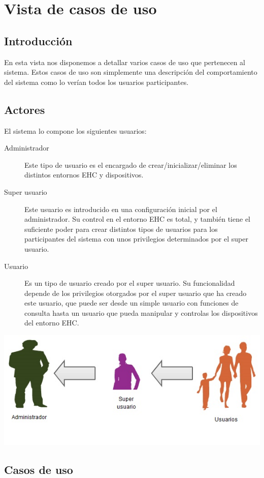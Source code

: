 \chapter{Vista de casos de uso}
\section{Introducci\'on}
En esta vista nos disponemos a detallar varios casos de uso que pertenecen al sistema. Estos casos de uso son simplemente una descripci\'on del comportamiento del sistema como lo ver\'ian todos los usuarios participantes.

\section{Actores}
El sistema lo compone los siguientes usuarios:
\begin{description}
\item[Administrador] Este tipo de usuario es el encargado de crear/inicializar/eliminar los distintos entornos EHC y dispositivos.
\item[Super usuario] Este usuario es introducido en una configuraci\'on inicial por el administrador. Su control en el entorno EHC es total, y tambi\'en tiene el suficiente poder para crear distintos tipos de usuarios para los participantes del sistema con unos privilegios determinados por el super usuario. 
\item[Usuario] Es un tipo de usuario creado por el super usuario. Su funcionalidad depende de los privilegios otorgados por el super usuario que ha creado este usuario, que puede ser desde un simple usuario con funciones de consulta hasta un usuario que pueda manipular y controlas los dispositivos del entorno EHC.
\end{description}

\includegraphics{4.Disenio/Imagenes/Actores}


\section{Casos de uso}
